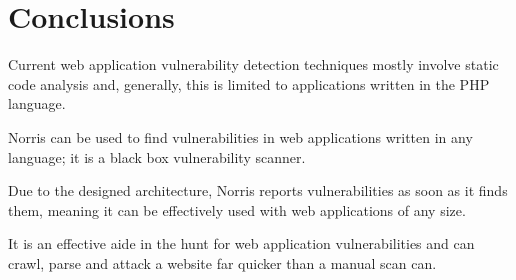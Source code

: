 \documentclass[12pt,a4paper]{article}
\begin{document}
\section{Conclusions}

Current web application vulnerability detection techniques mostly involve static code analysis and, generally, this is limited to applications written in the PHP language.

Norris can be used to find vulnerabilities in web applications written in any language; it is a black box vulnerability scanner. 

Due to the designed architecture, Norris reports vulnerabilities as soon as it finds them, meaning it can be effectively used with web applications of any size.

It is an effective aide in the hunt for web application vulnerabilities and can crawl, parse and attack a website far quicker than a manual scan can.


\end{document}
